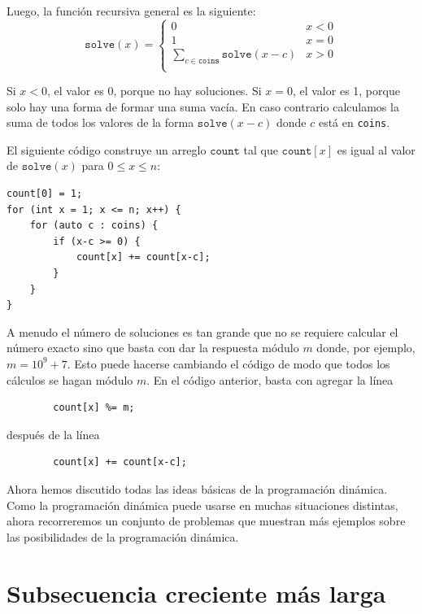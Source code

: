 Luego, la función recursiva general es la siguiente:
\begin{equation*}
    \texttt{solve}(x) = \begin{cases}
               0               & x < 0\\
               1               & x = 0\\
               \sum_{c \in \texttt{coins}} \texttt{solve}(x-c) & x > 0 \\
           \end{cases}
\end{equation*}

Si $x<0$, el valor es 0, porque no hay soluciones.
Si $x=0$, el valor es 1, porque solo hay una forma
de formar una suma vacía.
En caso contrario calculamos la suma de todos los valores
de la forma $\texttt{solve}(x-c)$ donde $c$ está en \texttt{coins}.

El siguiente código construye un arreglo
$\texttt{count}$ tal que
$\texttt{count}[x]$ es igual
al valor de $\texttt{solve}(x)$
para $0 \le x \le n$:

\begin{lstlisting}
count[0] = 1;
for (int x = 1; x <= n; x++) {
    for (auto c : coins) {
        if (x-c >= 0) {
            count[x] += count[x-c];
        }
    }
}
\end{lstlisting}

A menudo el número de soluciones es tan grande
que no se requiere calcular el número exacto
sino que basta con dar la respuesta módulo $m$
donde, por ejemplo, $m=10^9+7$.
Esto puede hacerse cambiando el código de modo que
todos los cálculos se hagan módulo $m$.
En el código anterior, basta con agregar la línea
\begin{lstlisting}
        count[x] %= m;
\end{lstlisting}
después de la línea
\begin{lstlisting}
        count[x] += count[x-c];
\end{lstlisting}

Ahora hemos discutido todas las ideas
básicas de la programación dinámica.
Como la programación dinámica puede usarse
en muchas situaciones distintas,
ahora recorreremos un conjunto de problemas
que muestran más ejemplos sobre las
posibilidades de la programación dinámica.

\section{Subsecuencia creciente más larga}

